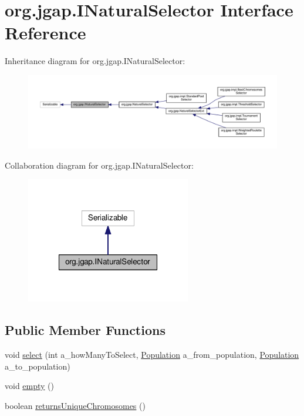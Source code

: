 \hypertarget{interfaceorg_1_1jgap_1_1_i_natural_selector}{\section{org.\-jgap.\-I\-Natural\-Selector Interface Reference}
\label{interfaceorg_1_1jgap_1_1_i_natural_selector}
}


Inheritance diagram for org.\-jgap.\-I\-Natural\-Selector\-:
\nopagebreak
\begin{figure}[H]
\begin{center}
\leavevmode
\includegraphics[width=350pt]{interfaceorg_1_1jgap_1_1_i_natural_selector__inherit__graph}
\end{center}
\end{figure}


Collaboration diagram for org.\-jgap.\-I\-Natural\-Selector\-:
\nopagebreak
\begin{figure}[H]
\begin{center}
\leavevmode
\includegraphics[width=204pt]{interfaceorg_1_1jgap_1_1_i_natural_selector__coll__graph}
\end{center}
\end{figure}
\subsection*{Public Member Functions}
\begin{DoxyCompactItemize}
\item 
void \hyperlink{interfaceorg_1_1jgap_1_1_i_natural_selector_a621ca08e2f66866178214093ca4412fd}{select} (int a\-\_\-how\-Many\-To\-Select, \hyperlink{classorg_1_1jgap_1_1_population}{Population} a\-\_\-from\-\_\-population, \hyperlink{classorg_1_1jgap_1_1_population}{Population} a\-\_\-to\-\_\-population)
\item 
void \hyperlink{interfaceorg_1_1jgap_1_1_i_natural_selector_a824307b8be94282a3dfd03aaa6531139}{empty} ()
\item 
boolean \hyperlink{interfaceorg_1_1jgap_1_1_i_natural_selector_a7a6e97dab3548d73a829c9b998df377a}{returns\-Unique\-Chromosomes} ()
\end{DoxyCompactItemize}
